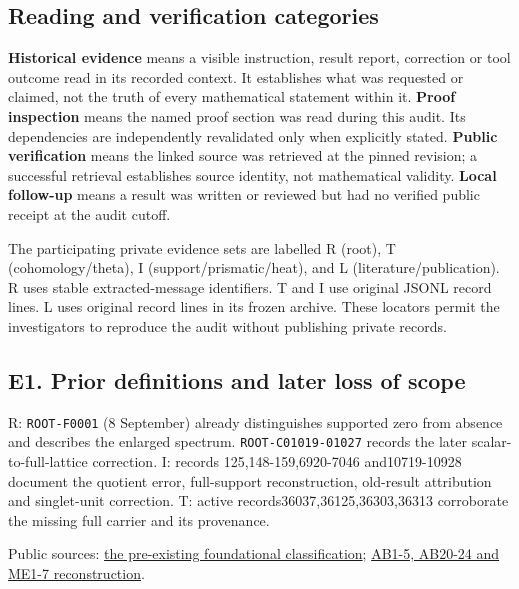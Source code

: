 \documentclass[
  british,
  11pt,
  a4paper,
]{article}
\begin{document}
\subsection{Reading and verification
categories}\label{reading-and-verification-categories}

\textbf{Historical evidence} means a visible instruction, result report,
correction or tool outcome read in its recorded context. It establishes
what was requested or claimed, not the truth of every mathematical
statement within it. \textbf{Proof inspection} means the named proof
section was read during this audit. Its dependencies are independently
revalidated only when explicitly stated. \textbf{Public verification}
means the linked source was retrieved at the pinned revision; a
successful retrieval establishes source identity, not mathematical
validity. \textbf{Local follow-up} means a result was written or
reviewed but had no verified public receipt at the audit cutoff.

The participating private evidence sets are labelled R (root), T
(cohomology/theta), I (support/prismatic/heat), and L
(literature/publication). R uses stable extracted-message identifiers. T
and I use original JSONL record lines. L uses original record lines in
its frozen archive. These locators permit the investigators to reproduce
the audit without publishing private records.

\subsection{E1. Prior definitions and later loss of
scope}\label{e1.-prior-definitions-and-later-loss-of-scope}

R: \texttt{ROOT-F0001} (8 September) already distinguishes supported
zero from absence and describes the enlarged spectrum.
\texttt{ROOT-C01019-01027} records the later scalar-to-full-lattice
correction. I: records 125,148-159,6920-7046 and10719-10928 document the
quotient error, full-support reconstruction, old-result attribution and
singlet-unit correction. T: active records36037,36125,36303,36313
corroborate the missing full carrier and its provenance.

Public sources:
\href{https://github.com/KokunoYumeto/zeta-function-research-reader/blob/d2f0020a7c446f429682925c1c682d99ba86a4cc/workbenches/splitzero-tandem/foundations/globalization-semiring/globalization_note.tex\#L239}{the
pre-existing foundational classification};
\href{https://github.com/KokunoYumeto/zeta-function-research-reader/blob/3c78cfbd9e194d35117b33277c421c6564ce3dbf/workbenches/splitzero-tandem/continuations/20260923-full-prime-support/031/01_REBUILT_MATHEMATICS.tex}{AB1-5,
AB20-24 and ME1-7 reconstruction}.
\end{document}
